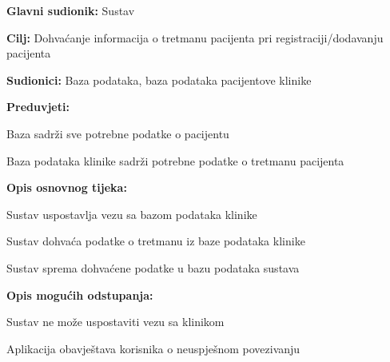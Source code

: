 					\noindent {}
					\begin{packed_item}
						\item \textbf{Glavni sudionik:} Sustav
						\item  \textbf{Cilj:} Dohvaćanje informacija o tretmanu pacijenta pri registraciji/dodavanju pacijenta
						\item  \textbf{Sudionici:} Baza podataka, baza podataka pacijentove klinike
						\item  \textbf{Preduvjeti:}
						\item[] \begin{packed_enum}
							\item Baza sadrži sve potrebne podatke o pacijentu
							\item Baza podataka klinike sadrži potrebne podatke o tretmanu pacijenta
						\end{packed_enum}
						
						\item  \textbf{Opis osnovnog tijeka:}
						\item[] \begin{packed_enum}
							\item Sustav uspostavlja vezu sa bazom podataka klinike
							\item Sustav dohvaća podatke o tretmanu iz baze podataka klinike
							\item Sustav sprema dohvaćene podatke u bazu podataka sustava
						\end{packed_enum}
						
						\item  \textbf{Opis mogućih odstupanja:}
						\item[] \begin{packed_item}
							\item[1.a] Sustav ne može uspostaviti vezu sa klinikom
							\item[] \begin{packed_enum}
								\item Aplikacija obavještava korisnika o neuspješnom povezivanju
							\end{packed_enum}
						\end{packed_item}
					\end{packed_item}
					
